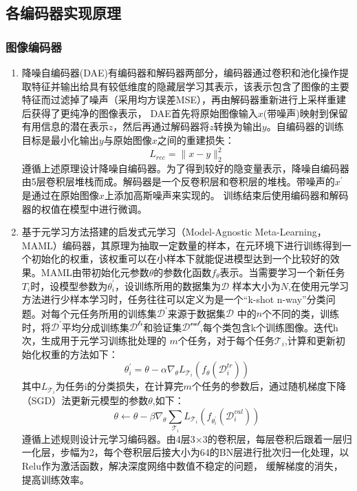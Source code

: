 \subsection{各编码器实现原理}
\subsubsection{图像编码器}
\begin{enumerate}[topsep = 0 pt, itemsep= 0 pt, parsep=0pt, partopsep=0pt, leftmargin=44pt, itemindent=0pt, labelsep=6pt, label=(\arabic*)]
\item 降噪自编码器(DAE)有编码器和解码器两部分，编码器通过卷积和池化操作提取特征并输出给具有较低维度的隐藏层学习其表示，该表示包含了图像的主要特征而过滤掉了噪声（采用均方误差MSE），再由解码器重新进行上采样重建后获得了更纯净的图像表示，
DAE首先将原始图像输入$x$(带噪声)映射到保留有用信息的潜在表示$z$，然后再通过解码器将$z$转换为输出$y$。自编码器的训练目标是最小化输出$y$与原始图像$x$之间的重建损失：
\begin{equation}
	\label{}
	L_{r e c}=\|x-y\|_2^2	
\end{equation}
遵循上述原理设计降噪自编码器。为了得到较好的隐变量表示，降噪自编码器由5层卷积层堆栈而成。解码器是一个反卷积层和卷积层的堆栈。带噪声的$x^{\prime}$是通过在原始图像$x$上添加高斯噪声来实现的。
训练结束后使用编码器和解码器的权值在模型中进行微调。

\item 基于元学习方法搭建的启发式元学习（Model-Agnostic Meta-Learning，MAML）编码器，其原理为抽取一定数量的样本，在元环境下进行训练得到一个初始化的权重，该权重可以在小样本下就能促进模型达到一个比较好的效果。MAML由带初始化元参数$\theta$的参数化函数$f_\theta$表示。当需要学习一个新任务$T_i$时，设模型参数为$\theta_i^{\prime}$，设训练所用的数据集为$\mathcal{D}$
样本大小为$N$,在使用元学习方法进行少样本学习时，任务往往可以定义为是一个“k-shot n-way”分类问题。对每个元任务所用的训练集$\mathcal{D^{\prime}}$来源于数据集$\mathcal{D}$
中的$n$个不同的类，训练时，将$\mathcal{D^{\prime}}$平均分成训练集$\mathcal{D^{tr}}$和验证集$\mathcal{D^{val}}$,每个类包含k个训练图像。迭代h次，生成用于元学习训练批处理的
$m$个任务，对于每个任务$\mathcal{T}_i$,计算和更新初始化权重的方法如下：
\begin{equation}
	\label{}
	\theta_i^{\prime}=\theta-\alpha \nabla_\theta L_{\mathcal{T}_i}\left(f_\theta\left(\mathcal{D}_i^{t r}\right)\right)
\end{equation}
其中$L_{\mathcal{T}_i}$为任务i的分类损失，在计算完$m$个任务的参数后，通过随机梯度下降（SGD）法更新元模型的参数$\theta$,如下：
\begin{equation}
	\label{}
	\theta \leftarrow \theta-\beta \nabla_\theta \sum_{\mathcal{T}_i} L_{\mathcal{T}_i}\left(f_{\theta_i^{\prime}}\left(\mathcal{D}_i^{v a l}\right)\right)
\end{equation}
遵循上述规则设计元学习编码器。由4层3×3的卷积层，每层卷积后跟着一层归一化层，步幅为2，每个卷积层后接大小为64的BN层进行批次归一化处理，以Relu作为激活函数，解决深度网络中数值不稳定的问题，
缓解梯度的消失，提高训练效率。


\end{enumerate}
